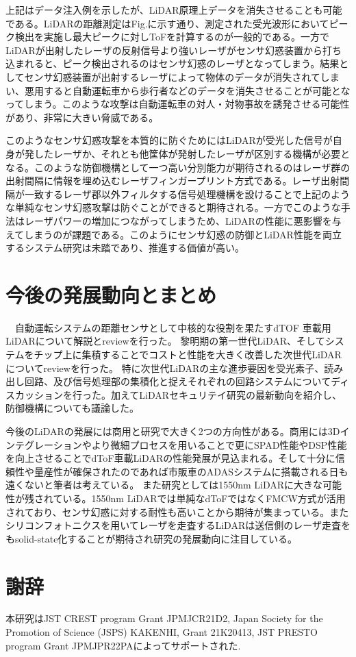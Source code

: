 \documentclass[twocolumn, 11pt, a4j]{article}
\begin{document}
上記はデータ注入例を示したが、LiDAR原理上データを消失させることも可能である。LiDARの距離測定はFig.に示す通り、測定された受光波形においてピーク検出を実施し最大ピークに対しToFを計算するのが一般的である。一方でLiDARが出射したレーザの反射信号より強いレーザがセンサ幻惑装置から打ち込まれると、ピーク検出されるのはセンサ幻惑のレーザとなってしまう。結果としてセンサ幻惑装置が出射するレーザによって物体のデータが消失されてしまい、悪用すると自動運転車から歩行者などのデータを消失させることが可能となってしまう。このような攻撃は自動運転車の対人・対物事故を誘発させる可能性があり、非常に大きい脅威である。

このようなセンサ幻惑攻撃を本質的に防ぐためにはLiDARが受光した信号が自身が発したレーザか、それとも他筐体が発射したレーザが区別する機構が必要となる。このような防御機構として一つ高い分別能力が期待されるのはレーザ群の出射間隔に情報を埋め込むレーザフィンガープリント方式である。レーザ出射間隔が一致するレーザ郡以外フィルタする信号処理機構を設けることで上記のような単純なセンサ幻惑攻撃は防ぐことができると期待される。一方でこのような手法はレーザパワーの増加につながってしまうため、LiDARの性能に悪影響を与えてしまうのが課題である。このようにセンサ幻惑の防御とLiDAR性能を両立するシステム研究は未踏であり、推進する価値が高い。

\section{今後の発展動向とまとめ}
　自動運転システムの距離センサとして中核的な役割を果たすdTOF 車載用LiDARについて解説とreviewを行った。
黎明期の第一世代LiDAR、そしてシステムをチップ上に集積することでコストと性能を大きく改善した次世代LiDARについてreviewを行った。
特に次世代LiDARの主な進歩要因を受光素子、読み出し回路、及び信号処理部の集積化と捉えそれぞれの回路システムについてディスカッションを行った。加えてLiDARセキュリテイ研究の最新動向を紹介し、防御機構についても議論した。

今後のLiDARの発展には商用と研究で大きく2つの方向性がある。商用には3Dインテグレーションやより微細プロセスを用いることで更にSPAD性能やDSP性能を向上させることでdToF車載LiDARの性能発展が見込まれる。そして十分に信頼性や量産性が確保されたのであれば市販車のADASシステムに搭載される日も遠くないと筆者は考えている。
また研究としては1550nm LiDARに大きな可能性が残されている。1550nm LiDARでは単純なdToFではなくFMCW方式が活用されており、センサ幻惑に対する耐性も高いことから期待が集まっている\cite{aptivpatent}。またシリコンフォトニクスを用いてレーザを走査するLiDARは送信側のレーザ走査をもsolid-state化することが期待され研究の発展動向に注目している。

\section*{謝辞}
\footnotesize
本研究はJST CREST program Grant JPMJCR21D2, Japan Society for the Promotion of Science (JSPS) KAKENHI, Grant 21K20413, JST PRESTO program Grant JPMJPR22PAによってサポートされた.



{\footnotesize
}
\end{document}
